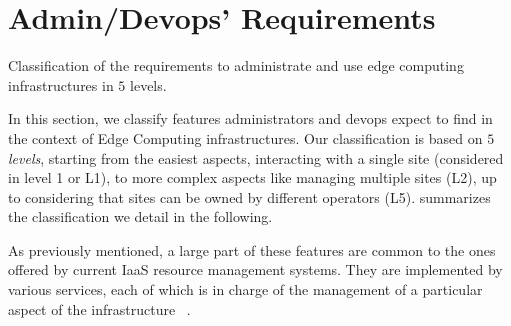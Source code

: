 
\section{Admin/Devops' Requirements}
\label{sec:requirements}

%   

\begin{table*}
    \centering
        
    \caption{Classification of the requirements to administrate and use edge
    computing infrastructures in $5$ levels.}
    \label{tab:requirements}
\end{table*}

In this section, we classify features administrators and devops expect
to find in the context of Edge Computing infrastructures.
Our classification is based on $5$ \emph{levels}, starting from the easiest
aspects, \ie interacting with a single site (considered in level 1 or L1), to
more complex aspects like managing multiple sites (L2), up to considering that
sites can be owned by different operators (L5).
 summarizes the classification we detail in the following. 

As previously mentioned, a large part of these features are common to
the ones offered by current IaaS resource management systems. They are
implemented by various services, each of which is in charge of the
management of a particular aspect of the infrastructure
~\cite{moreno2012csp}.

